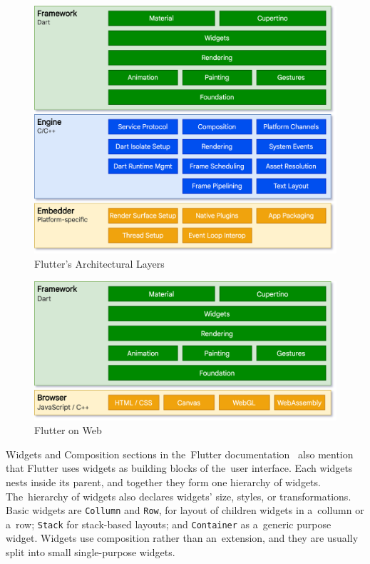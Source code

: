 \begin{figure}
    \centering
    \includegraphics[width=1\linewidth]{assets/design/flutterlayers.png}
    \caption{Flutter's Architectural Layers~\cite{a2022_flutter_architecture}}
    \label{fig:design:flutterlayers}
\end{figure}

\begin{figure}
    \centering
    \includegraphics[width=1\linewidth]{assets/design/flutterweb.png}
    \caption{Flutter on Web~\cite{a2022_flutter_architecture}}
    \label{fig:design:flutterweb}
\end{figure}

Widgets and Composition sections in the~Flutter documentation~\cite{a2022_flutter_architecture} also mention that Flutter uses widgets as building blocks of the~user interface.
Each widgets nests inside its parent, and together they form one hierarchy of widgets.
The~hierarchy of widgets also declares widgets' size, styles, or transformations.
Basic widgets are \texttt{Collumn} and \texttt{Row}, for layout of children widgets in a~collumn or a~row; \texttt{Stack} for stack-based layouts; and \texttt{Container} as a~generic purpose widget.
Widgets use composition rather than an~extension, and they are usually split into small single-purpose widgets.

